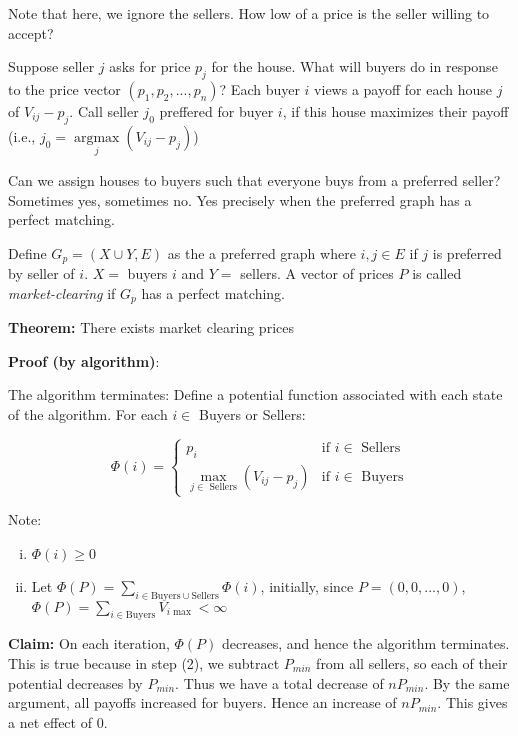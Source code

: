 \documentclass[11pt, letterpaper, oneside]{article}
\DeclareMathOperator*{\argmax}{argmax}
\begin{document}
Note that here, we ignore the sellers. How low of a price is the seller willing to accept?

Suppose seller $j$ asks for price $p_j$ for the house. What will buyers do in response to the price vector $(p_1, p_2, ..., p_n)$? Each buyer $i$ views a payoff for each house $j$ of $V_{ij}-p_j$. Call seller $j_0$ preffered for buyer $i$, if this house maximizes their payoff (i.e., $j_0 = \argmax\limits_{j} (V_{ij}-p_j)$)

Can we assign houses to buyers such that everyone buys from a preferred seller? Sometimes yes, sometimes no.  Yes precisely when the preferred graph has a perfect matching.

Define $G_p = (X \cup Y, E)$ as the a preferred graph where $i,j \in E$ if $j$ is preferred by seller of $i$. $X =$ buyers $i$ and $Y =$ sellers. A vector of prices $P$ is called \textit{market-clearing} if $G_p$ has a perfect matching.

\textbf{Theorem:} There exists market clearing prices

\textbf{Proof (by algorithm)}: 

\begin{algorithm}[H]
	\SetAlgoLined
\end{algorithm}

The algorithm terminates: Define a potential function associated with each state of the algorithm. For each $i \in $ Buyers or Sellers:

$$ \Phi(i) = \begin{cases}
p_i & \text{if } i \in \text{ Sellers} \\
\max\limits_{j \in \text{ Sellers}} (V_{ij}-p_j) & \text{if } i \in \text{ Buyers}
\end{cases} $$

Note:
\begin{enumerate}[(i)]
	\item $\Phi(i) \geq 0$
	\item Let $\Phi(P) = \sum\limits_{i \in \text{Buyers} \cup \text{Sellers}} \Phi(i)$, initially, since $P=(0,0,...,0)$, $\Phi(P) = \sum\limits_{i \in \text{Buyers}} V_{i\max} < \infty$
\end{enumerate}

\textbf{Claim:}  On each iteration, $\Phi(P)$ decreases, and hence the algorithm terminates. This is true because in step (2), we subtract $P_{min}$ from all sellers, so each of their potential decreases by $P_{min}$. Thus we have a total decrease of $nP_{min}$. By the same argument, all payoffs increased for buyers.  Hence an increase of $nP_{min}$. This gives a net effect of 0.
\end{document}
